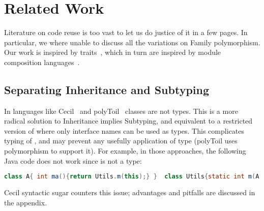 \saveSpace
\section{Related Work}
\saveSpace
Literature on code reuse is too vast to let us do justice of it in a few pages.
In particular, we where unable to discuss all the variations on Family polymorphism.
Our work is inspired by traits~\cite{ducasse2006traits}, which in turn
are inspired by module composition languages~\cite{ancona2002calculus}.

\subsection{Separating Inheritance and Subtyping}
In languages like Cecil~\cite{chambers1995typechecking} and polyToil~\cite{bruce1995polytoil}
classes are not types. This is a more radical solution to Inheritance implies Subtyping, and equivalent to a restricted version of \name where only interface names can be used as types.
This complicates typing of \Q@this@,
and may prevent any usefully application of \Q@This@ type (polyToil uses polymorphism to support it).
For example, in those approaches, the following Java code does not work since \Q@A@ is not a type:
\saveSpace\saveSpace\begin{lstlisting}[language=Java]
class A{ int ma(){return Utils.m(this);} }  class Utils{static int m(A a){..}}
\end{lstlisting}\saveSpace\saveSpace
Cecil syntactic sugar counters this issue; advantages and pitfalls are discussed in the appendix.

